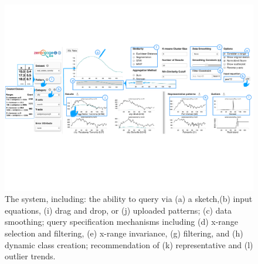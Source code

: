 \begin{figure}[ht!]
\centering
\vspace{-15pt}
\includegraphics[width=\linewidth]{figures/zvpp_system.pdf} %
\vspace{-5pt}\caption{The \zvpp system, including: the ability to query via (a) a sketch,(b) input equations, (i) drag and drop, or (j) uploaded patterns; (c) data smoothing; query specification mechanisms including (d) x-range selection and filtering, (e) x-range invariance, (g) filtering, and (h) dynamic class creation; recommendation of (k) representative and (l) outlier trends.} %
\label{zvOverview}
\vspace{-14pt}
\end{figure}
